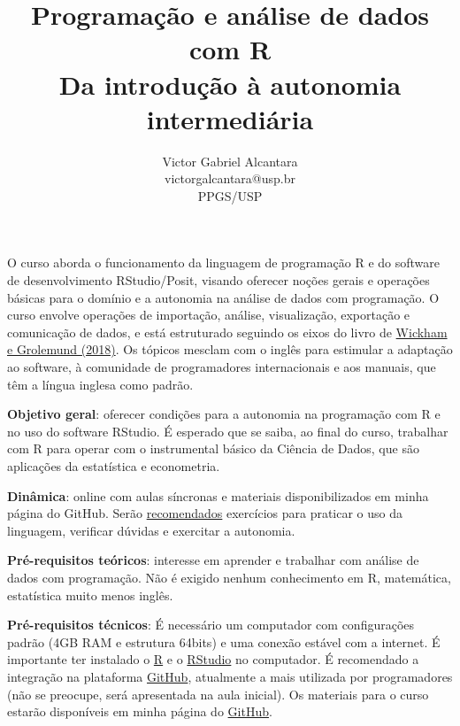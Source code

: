 \documentclass[a4paper,12pt]{article}
\title{\vspace{-3.5cm}Programação e análise de dados com R \\ \large Da introdução à autonomia intermediária}
\author{Victor Gabriel Alcantara \\ victorgalcantara@usp.br \\ PPGS/USP}
\date{}
\begin{document}
\maketitle

O curso aborda o funcionamento da linguagem de programação R e do software de desenvolvimento RStudio/Posit, visando oferecer noções gerais e operações básicas para o domínio e a autonomia na análise de dados com programação. O curso envolve operações de importação, análise, visualização, exportação e comunicação de dados, e está estruturado seguindo os eixos do livro de \href{https://r4ds.had.co.nz/}{Wickham e Grolemund (2018)}\cite{wickham_r_2017}. Os tópicos mesclam com o inglês para estimular a adaptação ao software, à comunidade de programadores internacionais e aos manuais, que têm a língua inglesa como padrão.

\vspace{1cm}

\textbf{Objetivo geral}: oferecer condições para a autonomia na programação com R e no uso do software RStudio. É esperado que se saiba, ao final do curso, trabalhar com R para operar com o instrumental básico da Ciência de Dados, que são aplicações da estatística e econometria.

\vspace{0.5cm}

\textbf{Dinâmica}: online com aulas síncronas e materiais disponibilizados em minha página do GitHub. Serão \underline{recomendados} exercícios para praticar o uso da linguagem, verificar dúvidas e exercitar a autonomia.

\vspace{0.5cm}

\textbf{Pré-requisitos teóricos}: interesse em aprender e trabalhar com análise de dados com programação. Não é exigido nenhum conhecimento em R, matemática, estatística muito menos inglês.

\vspace{0.5cm}

\textbf{Pré-requisitos técnicos}: É necessário um computador com configurações padrão (4GB RAM e estrutura 64bits) e uma conexão estável com a internet. É importante ter instalado o \href{https://brieger.esalq.usp.br/CRAN/}{R} e o \href{https://www.rstudio.com/products/rstudio/download}{RStudio} no computador. É recomendado a integração na plataforma \href{https://github.com/}{GitHub}, atualmente a mais utilizada por programadores (não se preocupe, será apresentada na aula inicial). Os materiais para o curso estarão disponíveis em minha página do \href{https://github.com/victorgalcantara?tab=repositories}{GitHub}.
\end{document}
